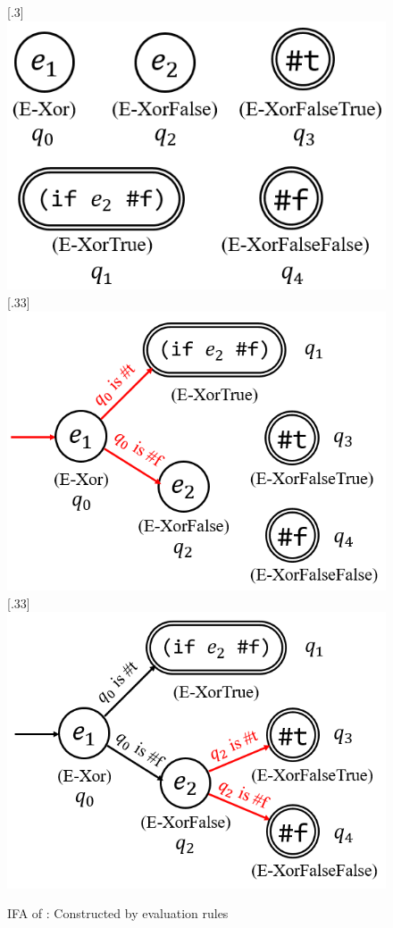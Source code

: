 \begin{figure}[t]
\centering
\subcaptionbox{\label{fig:ifa-xor-a}}[.3\linewidth]{
    \includegraphics[scale=0.22]{images/ifa/ifa-xor-1.png}
}
\subcaptionbox{\label{fig:ifa-xor-b}}[.33\linewidth]{
    \includegraphics[scale=0.22]{images/ifa/ifa-xor-2.png}
}
\subcaptionbox{\label{fig:ifa-xor-c}}[.33\linewidth]{
    \includegraphics[scale=0.22]{images/ifa/ifa-xor-3.png}
}
\caption{IFA of : Constructed by evaluation rules}
\label{fig:ifa-xor}
\end{figure}

